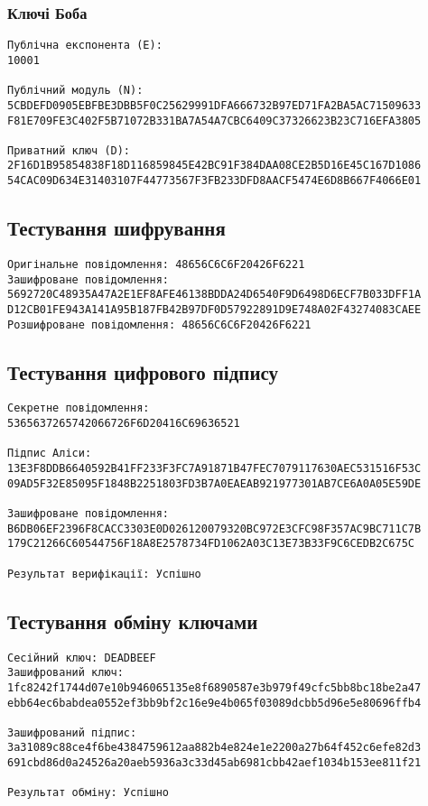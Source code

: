 \documentclass{article}
\begin{document}
\subsubsection{Ключі Боба}
\begin{verbatim}
Публічна експонента (E):
10001

Публічний модуль (N):
5CBDEFD0905EBFBE3DBB5F0C25629991DFA666732B97ED71FA2BA5AC71509633
F81E709FE3C402F5B71072B331BA7A54A7CBC6409C37326623B23C716EFA3805

Приватний ключ (D):
2F16D1B95854838F18D116859845E42BC91F384DAA08CE2B5D16E45C167D1086
54CAC09D634E31403107F44773567F3FB233DFD8AACF5474E6D8B667F4066E01
\end{verbatim}

\subsection{Тестування шифрування}
\begin{verbatim}
Оригінальне повідомлення: 48656C6C6F20426F6221
Зашифроване повідомлення: 
5692720C48935A47A2E1EF8AFE46138BDDA24D6540F9D6498D6ECF7B033DFF1A
D12CB01FE943A141A95B187FB42B97DF0D57922891D9E748A02F43274083CAEE
Розшифроване повідомлення: 48656C6C6F20426F6221
\end{verbatim}

\subsection{Тестування цифрового підпису}
\begin{verbatim}
Секретне повідомлення: 
5365637265742066726F6D20416C69636521

Підпис Аліси:
13E3F8DDB6640592B41FF233F3FC7A91871B47FEC7079117630AEC531516F53C
09AD5F32E85095F1848B2251803FD3B7A0EAEAB921977301AB7CE6A0A05E59DE

Зашифроване повідомлення:
B6DB06EF2396F8CACC3303E0D026120079320BC972E3CFC98F357AC9BC711C7B
179C21266C60544756F18A8E2578734FD1062A03C13E73B33F9C6CEDB2C675C

Результат верифікації: Успішно
\end{verbatim}

\subsection{Тестування обміну ключами}
\begin{verbatim}
Сесійний ключ: DEADBEEF
Зашифрований ключ:
1fc8242f1744d07e10b946065135e8f6890587e3b979f49cfc5bb8bc18be2a47
ebb64ec6babdea0552ef3bb9bf2c16e9e4b065f03089dcbb5d96e5e80696ffb4

Зашифрований підпис:
3a31089c88ce4f6be4384759612aa882b4e824e1e2200a27b64f452c6efe82d3
691cbd86d0a24526a20aeb5936a3c33d45ab6981cbb42aef1034b153ee811f21

Результат обміну: Успішно
\end{verbatim}
\end{document}
